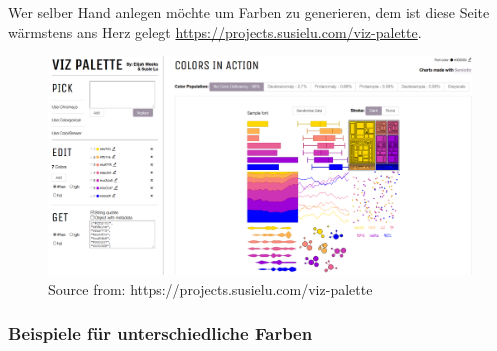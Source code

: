 \documentclass[
]{article}
\begin{document}
Wer selber Hand anlegen möchte um Farben zu generieren, dem ist diese Seite wärmstens ans Herz gelegt \url{https://projects.susielu.com/viz-palette}.

\begin{figure}

{\centering \includegraphics[width=1\linewidth]{images/064} 

}

\caption{Source from: https://projects.susielu.com/viz-palette}\label{fig:unnamed-chunk-243}
\end{figure}

\hypertarget{beispiele-fuxfcr-unterschiedliche-farben}{%
\subsubsection{Beispiele für unterschiedliche Farben}\label{beispiele-fuxfcr-unterschiedliche-farben}}
\end{document}
